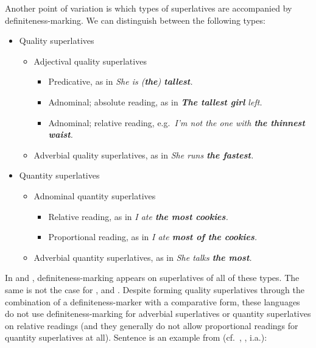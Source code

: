 \documentclass[output=paper
,modfonts
,nonflat]{langsci/langscibook}
\begin{document}
Another point of variation is which types of superlatives are accompanied by definiteness-marking. We can distinguish between the following types:
\begin{itemize}
\item {}Quality superlatives
\begin{itemize}
\item {}Adjectival quality superlatives
\begin{itemize}
\item Predicative, as in \textit{She is \textnormal{(}\textbf{the}\textnormal{)} \textbf{tallest}.}
\item {}Adnominal; absolute reading, as in \textit{\textbf{The tallest girl} left.}
\item {}Adnominal; relative reading, e.g.\ \textit{I'm not the one with \textbf{the thinnest waist}.}
\end{itemize}
\item Adverbial quality superlatives, as in \textit{She runs \textbf{the fastest}.}
\end{itemize}
\item Quantity superlatives
\begin{itemize}
\item {}Adnominal quantity superlatives
\begin{itemize}
\item Relative reading, as in \textit{I ate \textbf{the most cookies}.}
\item Proportional reading, as in \textit{I ate \textbf{most of the cookies}.}
\end{itemize}
\item {}Adverbial quantity superlatives, as in \textit{She talks \textbf{the most}.}
\end{itemize}
\end{itemize}

In  and , definiteness-marking appears on superlatives of all of these types. The same is not the case for ,  and . Despite forming quality superlatives through the combination of a definiteness-marker with a comparative form, these languages do not use definiteness-marking for adverbial superlatives or quantity superlatives on relative readings (and they generally do not allow proportional readings for quantity superlatives at all). Sentence  is an example from  (cf.\ \citealt{deBoer1986}, \citealt{Dobrovie-SorinGiurgea2015}, i.a.):
\end{document}
